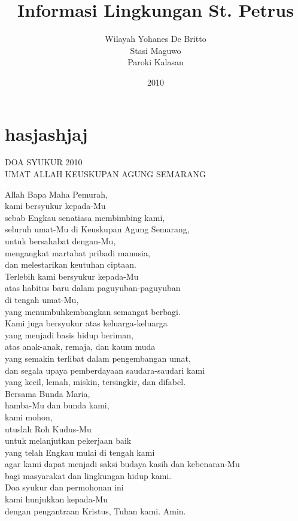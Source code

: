 \documentclass[a5paper,headsepline,titlepage,11pt,nnormalheadings,DIVcalc]{scrbook}
\title{Informasi Lingkungan St. Petrus}
\author{Wilayah Yohanes De Britto \\Stasi Maguwo \\Paroki Kalasan}
\date{2010}
\begin{document}
\section*{hasjashjaj}
\newpage
{\Large \center DOA SYUKUR 2010\\UMAT ALLAH KEUSKUPAN AGUNG SEMARANG}

Allah Bapa Maha Pemurah,\\
kami bersyukur kepada-Mu\\
sebab Engkau senatiasa membimbing kami,\\
seluruh umat-Mu di Keuskupan Agung Semarang,\\
untuk bersahabat dengan-Mu,\\
mengangkat martabat pribadi manusia,\\
dan melestarikan keutuhan ciptaan.\\

Terlebih kami bersyukur kepada-Mu\\
atas habitus baru dalam paguyuban-paguyuban\\
di tengah umat-Mu,\\
yang menumbuhkembangkan semangat berbagi.\\
Kami juga bersyukur atas keluarga-keluarga\\
yang menjadi basis hidup beriman,\\
atas anak-anak, remaja, dan kaum muda\\
yang semakin terlibat dalam pengembangan umat,\\
dan segala upaya pemberdayaan saudara-saudari kami\\
yang kecil, lemah, miskin, tersingkir, dan difabel.\\

Bersama Bunda Maria,\\
hamba-Mu dan bunda kami,\\
kami mohon,\\
utuslah Roh Kudus-Mu\\
untuk melanjutkan pekerjaan baik\\
yang telah Engkau mulai di tengah kami\\
agar kami dapat menjadi saksi budaya kasih dan kebenaran-Mu\\
bagi masyarakat dan lingkungan hidup kami.\\

Doa syukur dan permohonan ini\\
kami hunjukkan kepada-Mu\\
dengan pengantraan Kristus, Tuhan kami. Amin.
\end{document}
